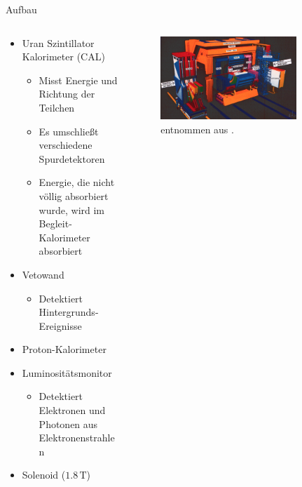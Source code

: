\documentclass[aspectratio=1610, 9pt]{beamer}
\begin{document}
\begin{frame}{Aufbau}
  \begin{columns}
    \begin{column}{0.4\textwidth}
      \begin{itemize}
        \item {Uran Szintillator Kalorimeter (CAL)}
        \begin{itemize}
          \item {Misst Energie und Richtung der Teilchen}
          \item {Es umschließt verschiedene  Spurdetektoren}
          \item{Energie, die nicht völlig absorbiert wurde, wird im Begleit-Kalorimeter absorbiert}
        \end{itemize}
          \item{Vetowand}
          \begin{itemize}
            \item {Detektiert Hintergrunds-Ereignisse}
          \end{itemize}
          \item {Proton-Kalorimeter}
          \item {Luminositätsmonitor}
          \begin{itemize}
            \item {Detektiert Elektronen und Photonen aus Elektronenstrahlen}
          \end{itemize}
          \item{Solenoid ($1.8 \,\mathrm{T} $)}
      \end{itemize}
    \end{column}

    \begin{column}{0.6\textwidth}
      \begin{figure}
        \centering
        \includegraphics[width=0.8\textwidth]{images/Zeus.png}
        \caption{entnommen aus \cite{DESY-ZEUS}.}
      \end{figure}
    \end{column}
  \end{columns}
\end{frame}
\end{document}
